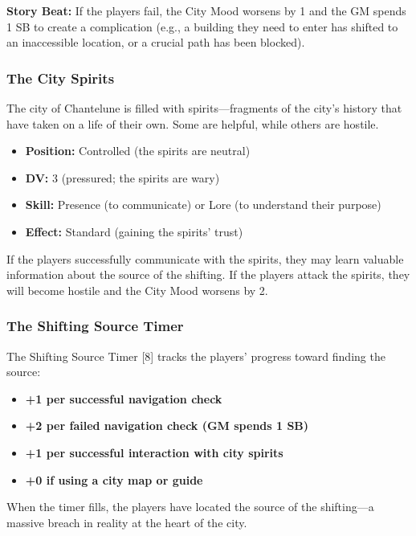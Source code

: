 \documentclass{article}
\begin{document}
\begin{storybox}
\textbf{Story Beat:} If the players fail, the City Mood worsens by 1 and the GM spends 1 SB to create a complication (e.g., a building they need to enter has shifted to an inaccessible location, or a crucial path has been blocked).
\end{storybox}

\subsubsection{The City Spirits}

The city of Chantelune is filled with spirits---fragments of the city's history that have taken on a life of their own. Some are helpful, while others are hostile.

\begin{itemize}
    \item \textbf{Position:} Controlled (the spirits are neutral)
    \item \textbf{DV:} 3 (pressured; the spirits are wary)
    \item \textbf{Skill:} Presence (to communicate) or Lore (to understand their purpose)
    \item \textbf{Effect:} Standard (gaining the spirits' trust)
\end{itemize}

If the players successfully communicate with the spirits, they may learn valuable information about the source of the shifting. If the players attack the spirits, they will become hostile and the City Mood worsens by 2.

\subsubsection{The Shifting Source Timer }

The Shifting Source Timer [8] tracks the players' progress toward finding the source:

\begin{itemize}
    \item \textbf{+1 per successful navigation check}
    \item \textbf{+2 per failed navigation check (GM spends 1 SB)}
    \item \textbf{+1 per successful interaction with city spirits}
    \item \textbf{+0 if using a city map or guide}
\end{itemize}

When the timer fills, the players have located the source of the shifting---a massive breach in reality at the heart of the city.
\end{document}
